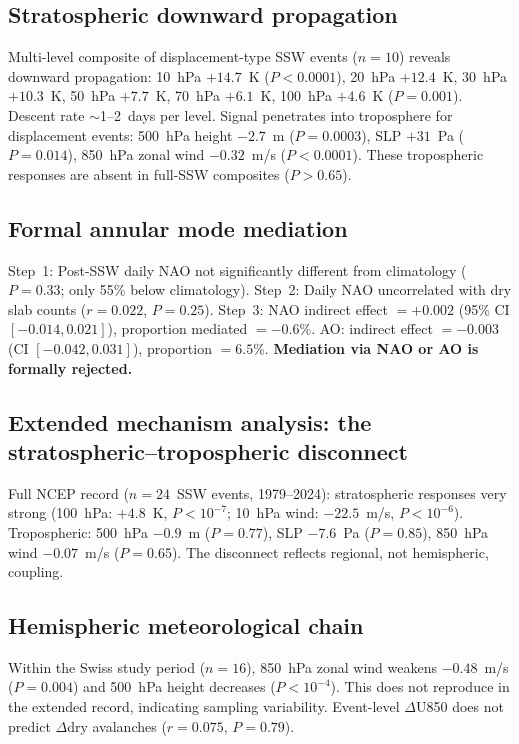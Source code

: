 \documentclass[11pt,letterpaper]{article}
\begin{document}
\subsection{Stratospheric downward propagation}

Multi-level composite of displacement-type SSW events ($n = 10$) reveals downward propagation: 10~hPa $+14.7$~K ($P < 0.0001$), 20~hPa $+12.4$~K, 30~hPa $+10.3$~K, 50~hPa $+7.7$~K, 70~hPa $+6.1$~K, 100~hPa $+4.6$~K ($P = 0.001$). Descent rate $\sim$1--2~days per level. Signal penetrates into troposphere for displacement events: 500~hPa height $-2.7$~m ($P = 0.0003$), SLP $+31$~Pa ($P = 0.014$), 850~hPa zonal wind $-0.32$~m/s ($P < 0.0001$). These tropospheric responses are absent in full-SSW composites ($P > 0.65$).

\subsection{Formal annular mode mediation}

Step~1: Post-SSW daily NAO not significantly different from climatology ($P = 0.33$; only 55\% below climatology). Step~2: Daily NAO uncorrelated with dry slab counts ($r = 0.022$, $P = 0.25$). Step~3: NAO indirect effect $= +0.002$ (95\% CI $[-0.014, 0.021]$), proportion mediated $= -0.6\%$. AO: indirect effect $= -0.003$ (CI $[-0.042, 0.031]$), proportion $= 6.5\%$. \textbf{Mediation via NAO or AO is formally rejected.}

\subsection{Extended mechanism analysis: the stratospheric--tropospheric disconnect}

Full NCEP record ($n = 24$~SSW events, 1979--2024): stratospheric responses very strong (100~hPa: $+4.8$~K, $P < 10^{-7}$; 10~hPa wind: $-22.5$~m/s, $P < 10^{-6}$). Tropospheric: 500~hPa $-0.9$~m ($P = 0.77$), SLP $-7.6$~Pa ($P = 0.85$), 850~hPa wind $-0.07$~m/s ($P = 0.65$). The disconnect reflects regional, not hemispheric, coupling.

\subsection{Hemispheric meteorological chain}

Within the Swiss study period ($n = 16$), 850~hPa zonal wind weakens $-0.48$~m/s ($P = 0.004$) and 500~hPa height decreases ($P < 10^{-4}$). This does not reproduce in the extended record, indicating sampling variability. Event-level $\Delta$U850 does not predict $\Delta$dry avalanches ($r = 0.075$, $P = 0.79$).
\end{document}
